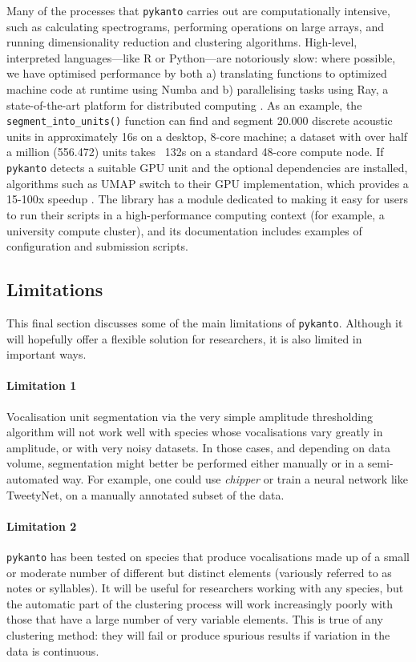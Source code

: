 Many of the processes that \texttt{pykanto} carries out are computationally
intensive, such as calculating spectrograms, performing operations on large
arrays, and running dimensionality reduction and clustering algorithms.
High-level, interpreted languages---like R or Python---are notoriously slow: where
possible, we have optimised performance by both a) translating functions to
optimized machine code at runtime using Numba \parencite{lam2015} and b)
parallelising tasks using Ray, a state-of-the-art platform for distributed
computing \parencite{moritz2018}. As an example, the \texttt{segment\_into\_units()}
function can find and segment 20.000 discrete acoustic units in approximately
16s on a desktop, 8-core machine; a dataset with over half a million (556.472)
units takes ~132s on a standard 48-core compute node. If \texttt{pykanto} detects a
suitable GPU unit and the optional dependencies are installed, algorithms such
as UMAP \parencite{mcinnes2018} switch to their GPU implementation, which provides a
15-100x speedup \parencite{nolet2021, raschka2020}. The library has a module
dedicated to making it easy for users to run their scripts in a high-performance
computing context (for example, a university compute cluster), and its
documentation includes examples of configuration and submission scripts.

\subsection{Limitations}

This final section discusses some of the main limitations of \texttt{pykanto}. Although it
will hopefully offer a flexible solution for researchers, it is also limited in
important ways.

\paragraph{Limitation 1} Vocalisation unit segmentation via the very simple amplitude
thresholding algorithm will not work well with species whose vocalisations vary
greatly in amplitude, or with very noisy datasets. In those cases, and depending
on data volume,  segmentation might better be performed either manually or in a
semi-automated way. For example, one could use \textit{chipper}
\parencite{searfoss2020a} or train a neural network like TweetyNet,
\parencite{cohen2022} on a manually annotated subset of the data.

\paragraph{Limitation 2} \texttt{pykanto} has been tested on species that produce
vocalisations made up of a small or moderate number of different but distinct
elements (variously referred to as notes or syllables). It will be useful for
researchers working with any species, but the automatic part of the clustering
process will work increasingly poorly with those that have a large number of
very variable elements. This is true of any clustering method: they will fail or
produce spurious results if variation in the data is continuous.

